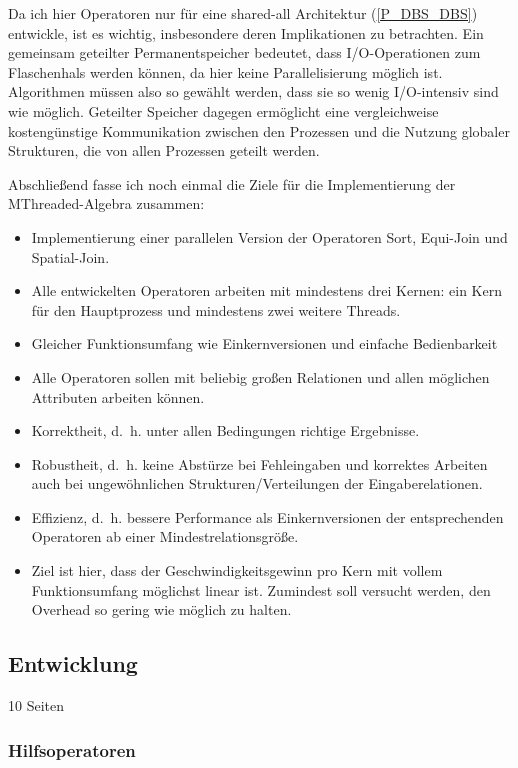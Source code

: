 \documentclass[a4paper,12pt,twoside]{article}
\begin{document}
Da ich hier Operatoren nur für eine shared-all Architektur (\autoref{P_DBS_DBS}) entwickle, ist es wichtig, insbesondere deren Implikationen zu betrachten. Ein gemeinsam geteilter Permanentspeicher bedeutet, dass I/O-Operationen zum Flaschenhals werden können, da hier keine Parallelisierung möglich ist. Algorithmen müssen also so gewählt werden, dass sie so wenig I/O-intensiv sind wie möglich. Geteilter Speicher dagegen ermöglicht eine vergleichweise kostengünstige Kommunikation zwischen den Prozessen und die Nutzung globaler Strukturen, die von allen Prozessen geteilt werden.

Abschließend fasse ich noch einmal die Ziele für die Implementierung der MThreaded-Algebra zusammen:

\begin{itemize}
	\item Implementierung einer parallelen Version der Operatoren Sort, Equi-Join und Spatial-Join.
	\item Alle entwickelten Operatoren arbeiten mit mindestens drei Kernen: ein Kern für den Hauptprozess und mindestens zwei weitere Threads.
	\item Gleicher Funktionsumfang wie Einkernversionen und einfache Bedienbarkeit
	\item Alle Operatoren sollen mit beliebig großen Relationen und allen möglichen Attributen arbeiten können.  
	\item Korrektheit, d.~h. unter allen Bedingungen richtige Ergebnisse.
	\item Robustheit, d.~h. keine Abstürze bei Fehleingaben und korrektes Arbeiten auch bei ungewöhnlichen Strukturen/Verteilungen der Eingaberelationen.
	\item Effizienz, d.~h. bessere Performance als Einkernversionen der entsprechenden Operatoren ab einer Mindestrelationsgröße.
	\item Ziel ist hier, dass der Geschwindigkeitsgewinn pro Kern mit vollem Funktionsumfang möglichst linear ist. Zumindest soll versucht werden, den Overhead so gering wie möglich zu halten.
\end{itemize}

\subsection{Entwicklung} 10 Seiten
\label{Entwicklung} 

\subsubsection{Hilfsoperatoren}
\end{document}
